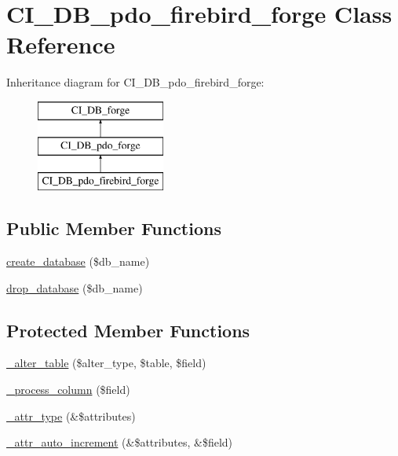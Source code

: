 \hypertarget{class_c_i___d_b__pdo__firebird__forge}{}\section{C\+I\+\_\+\+D\+B\+\_\+pdo\+\_\+firebird\+\_\+forge Class Reference}
\label{class_c_i___d_b__pdo__firebird__forge}
Inheritance diagram for C\+I\+\_\+\+D\+B\+\_\+pdo\+\_\+firebird\+\_\+forge\+:\begin{figure}[H]
\begin{center}
\leavevmode
\includegraphics[height=3.000000cm]{class_c_i___d_b__pdo__firebird__forge}
\end{center}
\end{figure}
\subsection*{Public Member Functions}
\begin{DoxyCompactItemize}
\item 
\mbox{\hyperlink{class_c_i___d_b__pdo__firebird__forge_a7784effa315a33db5c765af29445c531}{create\+\_\+database}} (\$db\+\_\+name)
\item 
\mbox{\hyperlink{class_c_i___d_b__pdo__firebird__forge_a6481e8231789cb2d81f24b6599c8181f}{drop\+\_\+database}} (\$db\+\_\+name)
\end{DoxyCompactItemize}
\subsection*{Protected Member Functions}
\begin{DoxyCompactItemize}
\item 
\mbox{\hyperlink{class_c_i___d_b__pdo__firebird__forge_acb065cea86fac1f4f09192ed90aecfad}{\+\_\+alter\+\_\+table}} (\$alter\+\_\+type, \$table, \$field)
\item 
\mbox{\hyperlink{class_c_i___d_b__pdo__firebird__forge_a951c875d7157f9d8934a79640439f87a}{\+\_\+process\+\_\+column}} (\$field)
\item 
\mbox{\hyperlink{class_c_i___d_b__pdo__firebird__forge_a3503b37bd661dfd14ae2715eae1f73c5}{\+\_\+attr\+\_\+type}} (\&\$attributes)
\item 
\mbox{\hyperlink{class_c_i___d_b__pdo__firebird__forge_a230f245caa7fbfc8d78ccdcc3bafd478}{\+\_\+attr\+\_\+auto\+\_\+increment}} (\&\$attributes, \&\$field)
\end{DoxyCompactItemize}

